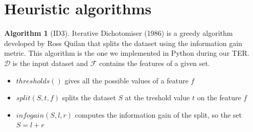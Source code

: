 \documentclass[12pt]{report}
\theoremstyle{definition}
\theoremstyle{definition}
\newtheorem*{algo}{Algorithm}
\begin{document}
\section{Heuristic algorithms}
\begin{algo}[ID3]
    Iterative Dichotomiser (1986) is a greedy algorithm developed by Ross Quilan that splits the dataset
    using the information gain metric. This algorithm is the one we implemented in Python during our TER.\\
    $\mathcal{D}$ is the input dataset and $\mathcal{F}$ contains the features of a given set.

\begin{algorithm}
    \caption{ID3}\label{alg:two}
    \DontPrintSemicolon

    \;
    \;

\end{algorithm}

\begin{itemize}
    \item $thresholds()$ gives all the possible values of a feature $f$
    \item $split(S, t, f)$ splits the dataset $S$ at the treshold value $t$ on the feature $f$
    \item $infogain(S, l, r)$ computes the information gain of the split, so the set $S=l+r$ 
\end{itemize}
\end{algo}
\end{document}
